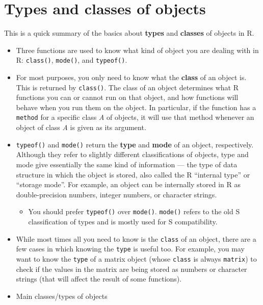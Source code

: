\documentclass[
]{book}
\providecommand{\tightlist}{%
  \setlength{\itemsep}{0pt}\setlength{\parskip}{0pt}}
\begin{document}
\hypertarget{types-and-classes-of-objects}{%
\section{Types and classes of objects}\label{types-and-classes-of-objects}}

This is a quick summary of the basics about \textbf{types} and \textbf{classes} of objects in R.

\begin{itemize}
\item
  Three functions are used to know what kind of object you are dealing with in R: \texttt{class()}, \texttt{mode()}, and \texttt{typeof()}.
\item
  For most purposes, you only need to know what the \textbf{class} of an object is. This is returned by \texttt{class()}. The class of an object determines what R functions you can or cannot run on that object, and how functions will behave when you run them on the object. In particular, if the function has a \texttt{method} for a specific class \emph{A} of objects, it will use that method whenever an object of class \emph{A} is given as its argument.
\item
  \texttt{typeof()} and \texttt{mode()} return the \textbf{type} and \textbf{mode} of an object, respectively. Although they refer to slightly different classifications of objects, type and mode give essentially the same kind of information --- the type of data structure in which the object is stored, also called the R ``internal type'' or ``storage mode''. For example, an object can be internally stored in R as double-precision numbers, integer numbers, or character strings.

  \begin{itemize}
  \tightlist
  \item
    You should prefer \texttt{typeof()} over \texttt{mode()}. \texttt{mode()} refers to the old S classification of types and is mostly used for S compatibility.
  \end{itemize}
\item
  While most times all you need to know is the \texttt{class} of an object, there are a few cases in which knowing the \texttt{type} is useful too. For example, you may want to know the \texttt{type} of a matrix object (whose \texttt{class} is always \texttt{matrix}) to check if the values in the matrix are being stored as numbers or character strings (that will affect the result of some functions).
\item
  Main classes/types of objects


\end{itemize}
\end{document}
